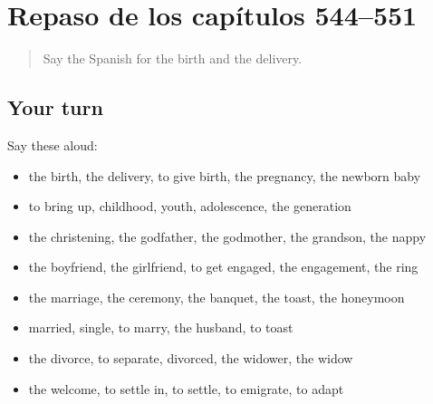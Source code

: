 \section[(dialogue)]{Repaso de los capítulos 544–551}

\label{lesson:ES-R551-repaso-544-551}



\begin{quote}
Say the Spanish for the birth and the delivery.
\end{quote}

\subsection*{Your turn}
Say these aloud:

\begin{itemize}
\raggedright
  \item the birth, the delivery, to give birth, the pregnancy, the newborn baby
  \item to bring up, childhood, youth, adolescence, the generation
  \item the christening, the godfather, the godmother, the grandson, the nappy
  \item the boyfriend, the girlfriend, to get engaged, the engagement, the ring
  \item the marriage, the ceremony, the banquet, the toast, the honeymoon
  \item married, single, to marry, the husband, to toast
  \item the divorce, to separate, divorced, the widower, the widow
  \item the welcome, to settle in, to settle, to emigrate, to adapt
\end{itemize}

